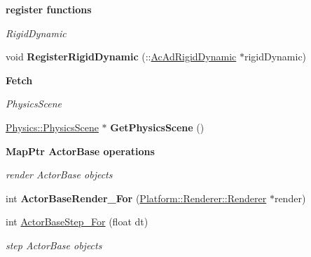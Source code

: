 \begin{Indent}{\bf register functions}\par
{\em \label{_amgrp74151e0c44c9df43fcf80837230dbc8a}
 RigidDynamic }\begin{DoxyCompactItemize}
\item 
\hypertarget{classContent_1_1Scene_af0d56be67cbcb4efad5215cfa33aa46c}{
void {\bfseries RegisterRigidDynamic} (::\hyperlink{classContent_1_1Actor_1_1Admin_1_1RigidDynamic}{AcAdRigidDynamic} $\ast$rigidDynamic)}
\label{classContent_1_1Scene_af0d56be67cbcb4efad5215cfa33aa46c}

\end{DoxyCompactItemize}
\end{Indent}
\begin{Indent}{\bf Fetch}\par
{\em \label{_amgrp4ea7755f84f02d23876d90be2f9765cf}
 PhysicsScene }\begin{DoxyCompactItemize}
\item 
\hypertarget{classContent_1_1Scene_a5afe6f9ed2ab48564b4507d668f63c46}{
\hyperlink{classContent_1_1Physics_1_1PhysicsScene}{Physics::PhysicsScene} $\ast$ {\bfseries GetPhysicsScene} ()}
\label{classContent_1_1Scene_a5afe6f9ed2ab48564b4507d668f63c46}

\end{DoxyCompactItemize}
\end{Indent}
\begin{Indent}{\bf MapPtr ActorBase operations}\par
{\em \label{_amgrp61212cb9feae85dabb2f0d2410cb68a0}
 render ActorBase objects }\begin{DoxyCompactItemize}
\item 
\hypertarget{classContent_1_1Scene_ab47c0b8c3419a8971242a30a2123f531}{
int {\bfseries ActorBaseRender\_\-For} (\hyperlink{classPlatform_1_1Renderer_1_1Renderer}{Platform::Renderer::Renderer} $\ast$render)}
\label{classContent_1_1Scene_ab47c0b8c3419a8971242a30a2123f531}

\item 
\hypertarget{classContent_1_1Scene_a13a00aed8548b91e8e77af027cf37ae3}{
int \hyperlink{classContent_1_1Scene_a13a00aed8548b91e8e77af027cf37ae3}{ActorBaseStep\_\-For} (float dt)}
\label{classContent_1_1Scene_a13a00aed8548b91e8e77af027cf37ae3}

\begin{DoxyCompactList}\small\item\em step ActorBase objects \item\end{DoxyCompactList}\end{DoxyCompactItemize}
\end{Indent}
